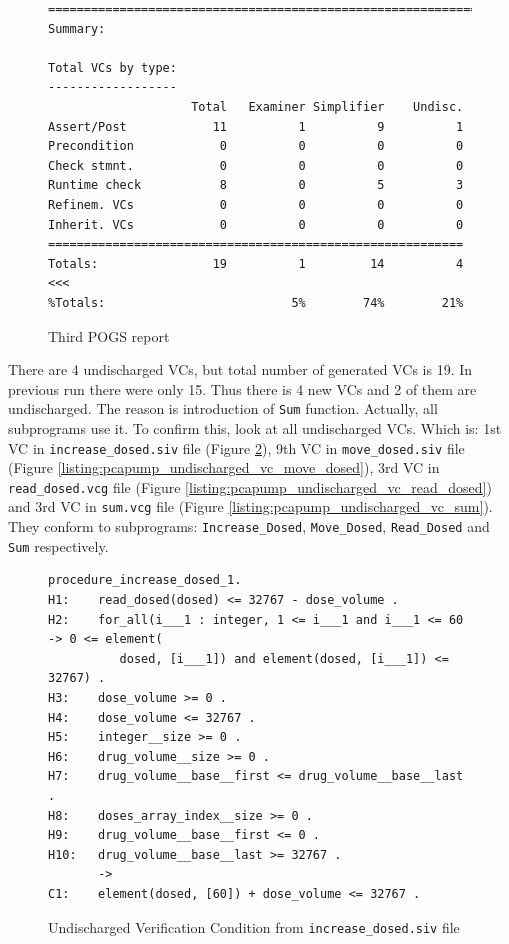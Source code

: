 \begin{figure}
\begin{lstlisting}[frame=single, gobble=0]
===============================================================================
Summary:

Total VCs by type:
------------------
                    Total   Examiner Simplifier    Undisc.
Assert/Post            11          1          9          1
Precondition            0          0          0          0
Check stmnt.            0          0          0          0
Runtime check           8          0          5          3
Refinem. VCs            0          0          0          0
Inherit. VCs            0          0          0          0
==========================================================
Totals:                19          1         14          4 <<<
%Totals:                          5%        74%        21%
\end{lstlisting}
\doublespacing
\caption{Third POGS report}
\label{listing:pcapump_dosemonitor_pogs3}
\end{figure}

There are 4 undischarged VCs, but total number of generated VCs is 19. In previous run there were only 15. Thus there is 4 new VCs and 2 of them are undischarged. The reason is introduction of \lstinline{Sum} function. Actually, all subprograms use it. To confirm this, look at all undischarged VCs. Which is: 1st VC in \lstinline{increase_dosed.siv} file (Figure \ref{listing:pcapump_undischarged_vc_increase_dosed}), 9th VC in \lstinline{move_dosed.siv} file (Figure \ref{listing:pcapump_undischarged_vc_move_dosed}), 3rd VC in \lstinline{read_dosed.vcg} file (Figure \ref{listing:pcapump_undischarged_vc_read_dosed}) and 3rd VC in \lstinline{sum.vcg} file (Figure \ref{listing:pcapump_undischarged_vc_sum}). They conform to subprograms: \lstinline{Increase_Dosed}, \lstinline{Move_Dosed}, \lstinline{Read_Dosed} and \lstinline{Sum} respectively.

\begin{figure}
\singlespacing
\begin{lstlisting}[frame=single, gobble=0]
procedure_increase_dosed_1.
H1:    read_dosed(dosed) <= 32767 - dose_volume .
H2:    for_all(i___1 : integer, 1 <= i___1 and i___1 <= 60 -> 0 <= element(
          dosed, [i___1]) and element(dosed, [i___1]) <= 32767) .
H3:    dose_volume >= 0 .
H4:    dose_volume <= 32767 .
H5:    integer__size >= 0 .
H6:    drug_volume__size >= 0 .
H7:    drug_volume__base__first <= drug_volume__base__last .
H8:    doses_array_index__size >= 0 .
H9:    drug_volume__base__first <= 0 .
H10:   drug_volume__base__last >= 32767 .
       ->
C1:    element(dosed, [60]) + dose_volume <= 32767 .
\end{lstlisting}
\doublespacing
\caption{Undischarged Verification Condition from \lstinline{increase_dosed.siv} file}
\label{listing:pcapump_undischarged_vc_increase_dosed}
\end{figure}

